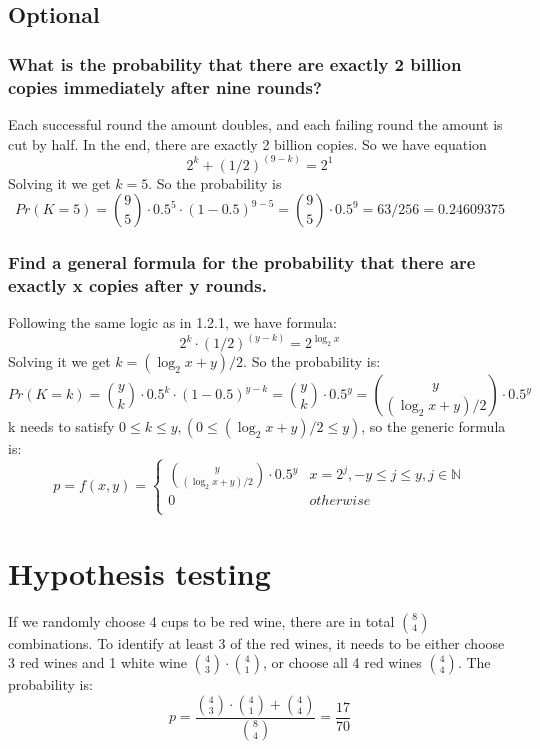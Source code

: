 \documentclass{article}
\begin{document}
\subsection{Optional}
\subsubsection{What is the probability that there are exactly 2 billion copies immediately after nine rounds?}

Each successful round the amount doubles, and each failing round the amount is cut by half. In the end, there are exactly 2 billion copies. So we have equation\\
\[ 2^k + (1/2)^(9-k) = 2^1 \]
Solving it we get \( k = 5 \). So the probability is \\
\[
Pr(K = 5) = {9 \choose 5} \cdot 0.5^5 \cdot (1-0.5)^{9-5} = {9 \choose 5} \cdot 0.5^9 = 63/256 = 0.24609375
\]

\subsubsection{Find a general formula for the probability that there are exactly x copies after y rounds.}
Following the same logic as in 1.2.1, we have formula: \\
\[
2^k \cdot (1/2)^{(y-k)} = 2^{\log_2 x}
\]
Solving it we get \( k = ({\log_2 x} + y)/2 \). So the probability is:\\
\[
Pr(K = k) = {y \choose k} \cdot 0.5^k \cdot (1 - 0.5)^{y-k} = {y \choose k} \cdot 0.5^y = 
{y \choose ({\log_2 x} + y )/2} \cdot 0.5^y
\]
k needs to satisfy \( 0 \leq k \leq y , (0 \leq ({\log_2 x} + y )/2 \leq y)\), so the generic formula is:\\
\[
p = f(x,y) = \left\{
\begin{array}{ll}
      {y \choose ({\log_2 x} + y )/2} \cdot 0.5^y & x = 2^j, -y \leq j \leq y, j \in \mathbb{N} \\
      0 & otherwise\\
\end{array} 
\right.
\]

\section{Hypothesis testing}
If we randomly choose 4 cups to be red wine, there are in total \( {8 \choose 4 }\) combinations.
To identify at least 3 of the red wines, it needs to be either choose 3 red wines and 1 white wine \( {4 \choose 3} \cdot {4 \choose 1}\), or choose all 4 red wines \( {4 \choose 4 }\).
The probability is:\\
\[
p = \frac{{4 \choose 3} \cdot {4 \choose 1} + {4 \choose 4}}{{8 \choose 4}} = \frac{17}{70}
\]
\end{document}
